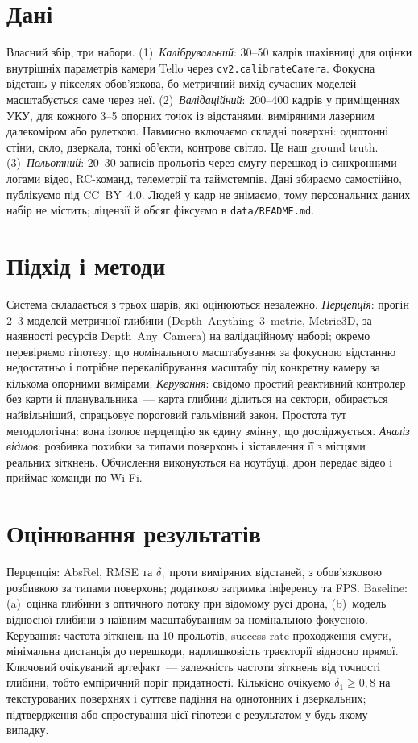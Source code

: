 \documentclass[ukrainian]{ucuproposal}
\begin{document}
\section{Дані}
Власний збір, три набори. (1)~\emph{Калібрувальний}: 30--50 кадрів
шахівниці для оцінки внутрішніх параметрів камери Tello через
\texttt{cv2.calibrateCamera}. Фокусна відстань у пікселях обов'язкова, бо
метричний вихід сучасних моделей масштабується саме через неї.
(2)~\emph{Валідаційний}: 200--400 кадрів у приміщеннях УКУ, для кожного
3--5 опорних точок із відстанями, виміряними лазерним далекоміром або
рулеткою. Навмисно включаємо складні поверхні: однотонні стіни, скло,
дзеркала, тонкі об'єкти, контрове світло. Це наш ground truth.
(3)~\emph{Польотний}: 20--30 записів прольотів через смугу перешкод із
синхронними логами відео, RC-команд, телеметрії та таймстемпів. Дані
збираємо самостійно, публікуємо під CC~BY~4.0. Людей у кадр не знімаємо,
тому персональних даних набір не містить; ліцензії й обсяг фіксуємо в
\texttt{data/README.md}.

\section{Підхід і методи}
Система складається з трьох шарів, які оцінюються незалежно.
\emph{Перцепція}: прогін 2--3 моделей метричної глибини
(Depth~Anything~3~metric, Metric3D, за наявності ресурсів
Depth~Any~Camera) на валідаційному наборі; окремо перевіряємо гіпотезу,
що номінального масштабування за фокусною відстанню недостатньо і
потрібне перекалібрування масштабу під конкретну камеру за кількома
опорними вимірами. \emph{Керування}: свідомо простий реактивний
контролер без карти й планувальника~--- карта глибини ділиться на
сектори, обирається найвільніший, спрацьовує пороговий гальмівний закон.
Простота тут методологічна: вона ізолює перцепцію як єдину змінну, що
досліджується. \emph{Аналіз відмов}: розбивка похибки за типами поверхонь
і зіставлення її з місцями реальних зіткнень. Обчислення виконуються на
ноутбуці, дрон передає відео і приймає команди по Wi-Fi.

\section{Оцінювання результатів}
Перцепція: AbsRel, RMSE та \(\delta_1\) проти виміряних відстаней, з
обов'язковою розбивкою за типами поверхонь; додатково затримка інференсу
та FPS. Baseline: (a)~оцінка глибини з оптичного потоку при відомому
русі дрона, (b)~модель відносної глибини з наївним масштабуванням за
номінальною фокусною. Керування: частота зіткнень на 10 прольотів,
success rate проходження смуги, мінімальна дистанція до перешкоди,
надлишковість траєкторії відносно прямої. Ключовий очікуваний
артефакт~--- залежність частоти зіткнень від точності глибини, тобто
емпіричний поріг придатності. Кількісно очікуємо \(\delta_1 \geq 0{,}8\)
на текстурованих поверхнях і суттєве падіння на однотонних і дзеркальних;
підтвердження або спростування цієї гіпотези є результатом у будь-якому
випадку.
\end{document}
